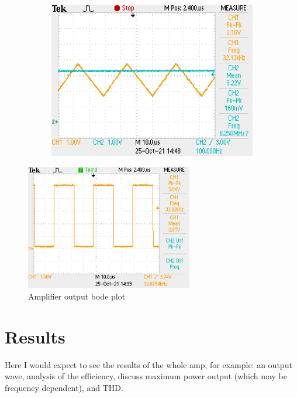 \documentclass[a4paper,11pt]{article}
\begin{document}
\begin{figure}[h!]
\begin{subfigure}{0.48\textwidth}
        \subcaption{}
    \end{subfigure}
    \begin{subfigure}{0.48\textwidth}
        \includegraphics[width=\columnwidth]{spwm/input_sampling_1.JPG}
        \subcaption{}
    \end{subfigure}
    \caption{}
\end{figure}

\begin{figure}[h!]
    \centering
    \includegraphics[width=0.65\textwidth]{spwm/spwm_no_input.JPG}
    \caption{Amplifier output bode plot}
\end{figure}


\section{Results}

Here I would expect to see the results of the whole amp, for example: an output wave, analysis of the efficiency, discuss maximum power output (which may be frequency dependent), and THD.
\end{document}

